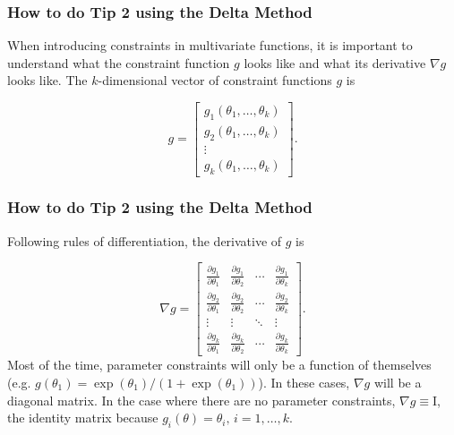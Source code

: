 \documentclass[english,xcolor=dvipsnames]{beamer}
\begin{document}
\begin{frame}
\frametitle{How to do Tip 2 using the Delta Method}
When introducing constraints in multivariate functions, it is important to understand what the constraint function $g$ looks like and what its derivative $\nabla g$ looks like. The $k$-dimensional vector of constraint functions $g$ is

	\begin{equation}
	g = \left[\begin{array}{c}
g_{1}(\theta_{1},\ldots,\theta_{k}) \\
g_{2}(\theta_{1},\ldots,\theta_{k}) \\
\vdots \\
g_{k}(\theta_{1},\ldots,\theta_{k})
\end{array}\right].
	\label{eq:3}
  \end{equation} 
\end{frame}

\begin{frame}
\frametitle{How to do Tip 2 using the Delta Method}
Following rules of differentiation, the derivative of $g$ is
	
	\begin{equation}
	\nabla g = \left[\begin{array}{cccc}
\frac{\partial g_1}{\partial \theta_1} & \frac{\partial g_1}{\partial \theta_2} & \cdots & \frac{\partial g_1}{\partial \theta_k} \\
\frac{\partial g_2}{\partial \theta_1} & \frac{\partial g_2}{\partial \theta_2} & \cdots & \frac{\partial g_2}{\partial \theta_k} \\
\vdots & \vdots & \ddots & \vdots \\
\frac{\partial g_k}{\partial \theta_1} & \frac{\partial g_k}{\partial \theta_2} & \cdots & \frac{\partial g_k}{\partial \theta_k}
\end{array}\right].
	\label{eq:4}
  \end{equation}
Most of the time, parameter constraints will only be a function of themselves (e.g. $g(\theta_1)=\exp(\theta_1)/(1+\exp(\theta_1))$). In these cases, $\nabla g$ will be a diagonal matrix. In the case where there are no parameter constraints, $\nabla g \equiv \mathrm{I}$, the identity matrix because $g_i(\theta)=\theta_i,\,i=1,\ldots,k$. 
\end{frame}
\end{document}

